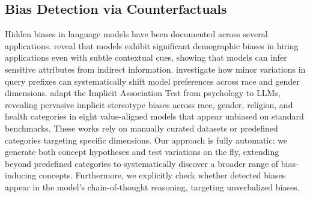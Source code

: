 \subsection{Bias Detection via Counterfactuals}

Hidden biases in language models have been documented across several applications. \citet{llm-fairness-2025} reveal that models exhibit significant demographic biases in hiring applications even with subtle contextual cues, showing that models can infer sensitive attributes from indirect information. \citet{prefix-bias-2025} investigate how minor variations in query prefixes can systematically shift model preferences across race and gender dimensions. \citet{implicit-bias-llm-2024} adapt the Implicit Association Test from psychology to LLMs, revealing pervasive implicit stereotype biases across race, gender, religion, and health categories in eight value-aligned models that appear unbiased on standard benchmarks. These works rely on manually curated datasets or predefined categories targeting specific dimensions. Our approach is fully automatic: we generate both concept hypotheses and test variations on the fly, extending beyond predefined categories to systematically discover a broader range of bias-inducing concepts. Furthermore, we explicitly check whether detected biases appear in the model's chain-of-thought reasoning, targeting unverbalized biases.